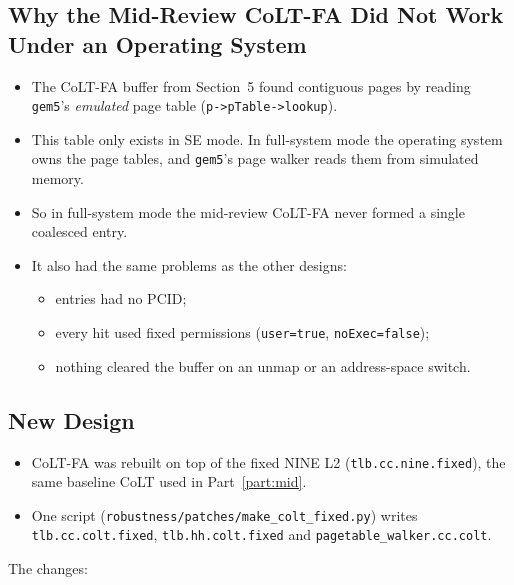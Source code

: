 \subsection{Why the Mid-Review CoLT-FA Did Not Work Under an Operating System}
\begin{itemize}
    \item The CoLT-FA buffer from Section~5 found contiguous pages by reading \texttt{gem5}'s \emph{emulated} page table (\texttt{p->pTable->lookup}).
    \item This table only exists in SE mode. In full-system mode the operating system owns the page tables, and \texttt{gem5}'s page walker reads them from simulated memory.
    \item So in full-system mode the mid-review CoLT-FA never formed a single coalesced entry.
    \item It also had the same problems as the other designs:
    \begin{itemize}
        \item entries had no PCID;
        \item every hit used fixed permissions (\texttt{user=true}, \texttt{noExec=false});
        \item nothing cleared the buffer on an unmap or an address-space switch.
    \end{itemize}
\end{itemize}

\subsection{New Design}
\begin{itemize}
    \item CoLT-FA was rebuilt on top of the fixed NINE L2 (\texttt{tlb.cc.nine.fixed}), the same baseline CoLT used in Part~\ref{part:mid}.
    \item One script (\texttt{robustness/patches/make\_colt\_fixed.py}) writes \texttt{tlb.cc.colt.fixed}, \texttt{tlb.hh.colt.fixed} and \texttt{pagetable\_walker.cc.colt}.
\end{itemize}
The changes:

